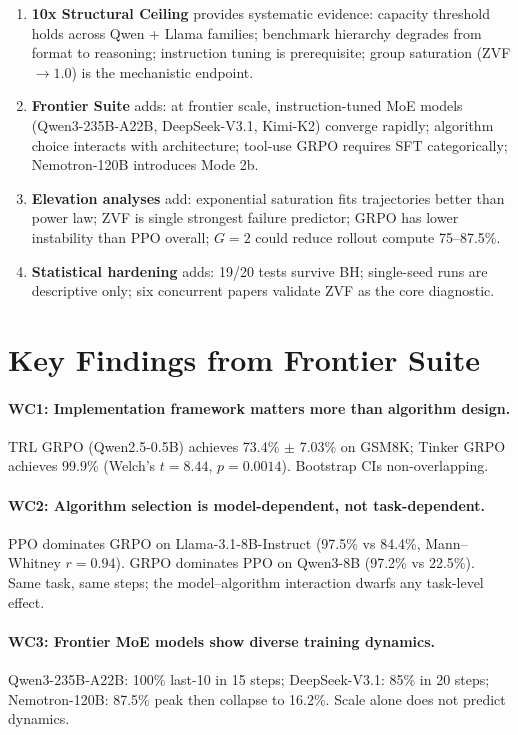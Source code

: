 \documentclass[12pt,a4paper]{report}
\theoremstyle{definition}
\begin{document}
\begin{enumerate}[nosep]
\item \textbf{10x Structural Ceiling} provides systematic evidence: capacity threshold holds across
Qwen + Llama families; benchmark hierarchy degrades from format to reasoning; instruction tuning is
prerequisite; group saturation (ZVF $\to 1.0$) is the mechanistic endpoint.
\item \textbf{Frontier Suite} adds: at frontier scale, instruction-tuned MoE models (Qwen3-235B-A22B,
DeepSeek-V3.1, Kimi-K2) converge rapidly; algorithm choice interacts with architecture; tool-use GRPO
requires SFT categorically; Nemotron-120B introduces Mode 2b.
\item \textbf{Elevation analyses} add: exponential saturation fits trajectories better than power law;
ZVF is single strongest failure predictor; GRPO has lower instability than PPO overall; $G = 2$ could
reduce rollout compute 75--87.5\%.
\item \textbf{Statistical hardening} adds: 19/20 tests survive BH; single-seed runs are descriptive
only; six concurrent papers validate ZVF as the core diagnostic.
\end{enumerate}

\section{Key Findings from Frontier Suite}
\label{sec:wc-findings}

\paragraph{WC1: Implementation framework matters more than algorithm design.}
TRL GRPO (Qwen2.5-0.5B) achieves 73.4\% $\pm$ 7.03\% on GSM8K; Tinker GRPO achieves 99.9\%
(Welch's $t = 8.44$, $p = 0.0014$). Bootstrap CIs non-overlapping.

\paragraph{WC2: Algorithm selection is model-dependent, not task-dependent.}
PPO dominates GRPO on Llama-3.1-8B-Instruct (97.5\% vs 84.4\%, Mann--Whitney $r = 0.94$). GRPO
dominates PPO on Qwen3-8B (97.2\% vs 22.5\%). Same task, same steps; the model--algorithm interaction
dwarfs any task-level effect.

\paragraph{WC3: Frontier MoE models show diverse training dynamics.}
Qwen3-235B-A22B: 100\% last-10 in 15 steps; DeepSeek-V3.1: 85\% in 20 steps; Nemotron-120B: 87.5\%
peak then collapse to 16.2\%. Scale alone does not predict dynamics.
\end{document}
